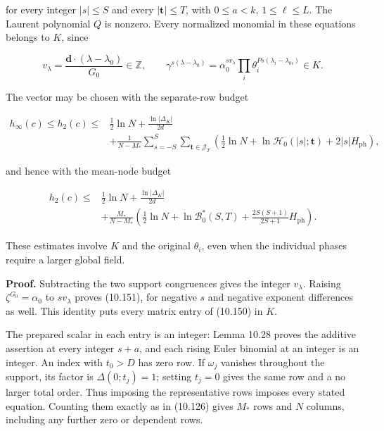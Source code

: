 \documentclass[
  11pt,
  a4paper,
]{article}
\begin{document}
for every integer \(|s|\le S\) and every \(|\boldsymbol t|\le T\), with
\(0\le a<k\), \(1\le\ell\le L\). The Laurent polynomial \(Q\) is
nonzero. Every normalized monomial in these equations belongs to \(K\),
since

\[
v_\lambda=\frac{\boldsymbol d\cdot(\lambda-\lambda_0)}{G_0}\in\mathbb Z,
\qquad
\gamma^{s(\lambda-\lambda_0)}
=\alpha_0^{s v_\lambda}
\prod_i\theta_i^{Ps(\lambda_i-\lambda_{0i})}\in K.
\tag{10.151}
\]

The vector may be chosen with the separate-row budget

\[
\begin{aligned}
h_\infty(c)\le h_2(c)\le&
\tfrac12\ln N+\frac{\ln|\Delta_K|}{2d}\\
&+\frac1{N-M_*}
\sum_{s=-S}^S\sum_{\boldsymbol t\in\mathcal J_T}
\left(\tfrac12\ln N+
\ln\mathcal H_0(|s|;\boldsymbol t)+2|s|H_{\mathrm{ph}}\right),
\end{aligned}
\tag{10.152}
\]

and hence with the mean-node budget

\[
\begin{aligned}
h_2(c)\le&
\tfrac12\ln N+\frac{\ln|\Delta_K|}{2d}\\
&+\frac{M_*}{N-M_*}
\left(\tfrac12\ln N+\ln\mathcal B_0^*(S,T)
+\frac{2S(S+1)}{2S+1}H_{\mathrm{ph}}\right).
\end{aligned}
\tag{10.153}
\]

These estimates involve \(K\) and the original \(\theta_i\), even when
the individual phases require a larger global field.

\textbf{Proof.} Subtracting the two support congruences gives the
integer \(v_\lambda\). Raising \(\zeta^{G_0}=\alpha_0\) to
\(s v_\lambda\) proves (10.151), for negative \(s\) and negative
exponent differences as well. This identity puts every matrix entry of
(10.150) in \(K\).

The prepared scalar in each entry is an integer: Lemma 10.28 proves the
additive assertion at every integer \(s+a\), and each rising Euler
binomial at an integer is an integer. An index with \(t_0>D\) has zero
row. If \(\omega_j\) vanishes throughout the support, its factor is
\(\Delta(0;t_j)=1\); setting \(t_j=0\) gives the same row and a no
larger total order. Thus imposing the representative rows imposes every
stated equation. Counting them exactly as in (10.126) gives \(M_*\) rows
and \(N\) columns, including any further zero or dependent rows.
\end{document}
